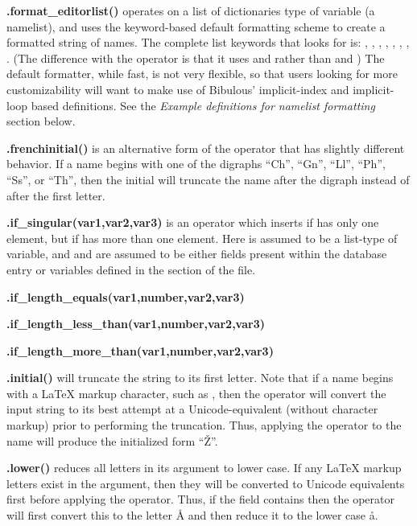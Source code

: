 \documentclass[letterpaper,10pt,english]{sphinxmanual}
\begin{document}
\textbf{.format\_editorlist()} operates on a list of dictionaries type of variable (a namelist), and uses the keyword-based default formatting scheme to create a formatted string of names.  The complete list keywords that looks for is: , , , , , , , . (The difference with the  operator is that it uses  and  rather than  and ) The default formatter, while fast, is not very flexible, so that users looking for more customizability will want to make use of Bibulous' implicit-index and implicit-loop based definitions. See the \emph{Example definitions for namelist formatting} section below.

\textbf{.frenchinitial()} is an alternative form of the  operator that has slightly different behavior. If a name begins with one of the digraphs
``Ch'', ``Gn'', ``Ll'', ``Ph'', ``Ss'', or ``Th'', then the initial will truncate the name after the digraph instead of after the first letter.

\textbf{.if\_singular(var1,var2,var3)} is an operator which inserts  if  has only one element, but  if  has more than one element. Here  is assumed to be a list-type of variable, and  and  are assumed to be either fields present within the database entry or variables defined in the  section of the file.

\textbf{.if\_length\_equals(var1,number,var2,var3)}

\textbf{.if\_length\_less\_than(var1,number,var2,var3)}

\textbf{.if\_length\_more\_than(var1,number,var2,var3)}

\textbf{.initial()} will truncate the string to its first letter. Note that if a name begins with a LaTeX markup character, such as , then the operator will convert the input string to its best attempt at a Unicode-equivalent (without character markup) prior to performing the truncation. Thus, applying the  operator to the name  will produce the initialized form ``Ž''.

\textbf{.lower()} reduces all letters in its argument to lower case. If any LaTeX markup letters exist in the argument, then they will be converted to Unicode equivalents first before applying the operator. Thus, if the field  contains  then the operator will first convert this to the letter Å and then reduce it to the lower case å.
\end{document}
